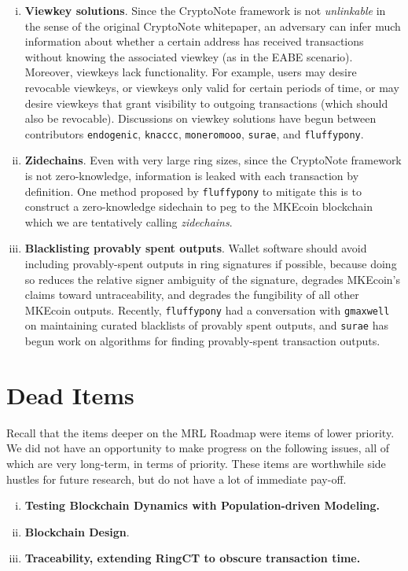 \documentclass[12pt,english]{mrl}
\theoremstyle{definition}
\numberwithin{equation}{section}
\numberwithin{figure}{section}
\numberwithin{equation}{section}
\numberwithin{equation}{section}
\numberwithin{figure}{section}
\begin{document}
\begin{enumerate}[i.]
\item \textbf{Viewkey solutions}. Since the CryptoNote framework is not \emph{unlinkable} in the sense of the original CryptoNote whitepaper, an adversary can infer much information about whether a certain address has received transactions without knowing the associated viewkey (as in the EABE scenario). Moreover, viewkeys lack functionality. For example, users may desire revocable viewkeys, or viewkeys only valid for certain periods of time, or may desire viewkeys that grant visibility to outgoing transactions (which should also be revocable). Discussions on viewkey solutions have begun between contributors \texttt{endogenic}, \texttt{knaccc}, \texttt{moneromooo}, \texttt{surae}, and  \texttt{fluffypony}.

\item \textbf{Zidechains}. Even with very large ring sizes, since the CryptoNote framework is not zero-knowledge, information is leaked with each transaction by definition. One method proposed by \texttt{fluffypony} to mitigate this is to construct a zero-knowledge sidechain to peg to the MKEcoin blockchain which we are tentatively calling \textit{zidechains}.

\item \textbf{Blacklisting provably spent outputs}. Wallet software should avoid including provably-spent outputs in ring signatures if possible, because doing so reduces the relative signer ambiguity of the signature, degrades MKEcoin's claims toward untraceability, and degrades the fungibility of all other MKEcoin outputs. Recently, \texttt{fluffypony} had a conversation with \texttt{gmaxwell} on maintaining curated blacklists of provably spent outputs, and \texttt{surae} has begun work on algorithms for finding provably-spent transaction outputs.
\end{enumerate}


\section{Dead Items}

Recall that the items deeper on the MRL Roadmap were items of lower priority. We did not have an opportunity to make progress on the following issues, all of which are very long-term, in terms of priority. These items are worthwhile side hustles for future research, but do not have a lot of immediate pay-off.

\begin{enumerate}[i.]
    \item \textbf{Testing Blockchain Dynamics with Population-driven Modeling.} 
    
    \item \textbf{Blockchain Design}.
    
    \item \textbf{Traceability, extending RingCT to obscure transaction time.}
\end{enumerate}
\end{document}
